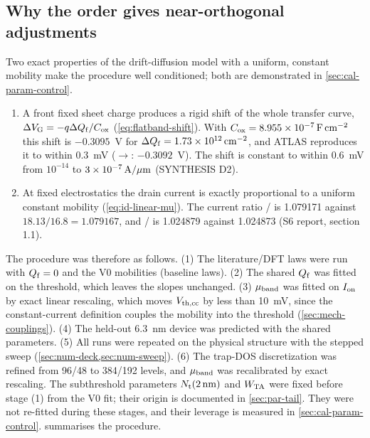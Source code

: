 \subsection{Why the order gives near-orthogonal adjustments}\label{sec:cal-order}
Two exact properties of the drift-diffusion model with a uniform, constant mobility make the procedure well conditioned; both are demonstrated in \cref{sec:cal-param-control}.
\begin{enumerate}
\item A front fixed sheet charge produces a rigid shift of the whole transfer curve, $\Delta V_{\mathrm{G}}=-q\Delta Q_{\mathrm{f}}/C_{\mathrm{ox}}$ (\cref{eq:flatband-shift}). With $C_{\mathrm{ox}}=\SI{8.955e-7}{\farad\per\centi\metre\squared}$ this shift is $-0.3095$~V for $\Delta Q_{\mathrm{f}}=\SI{1.73e12}{cm^{-2}}$, and ATLAS reproduces it to within 0.3~mV ($\rightarrow$: $-0.3092$~V). The shift is constant to within 0.6~mV from $10^{-14}$ to $3\times10^{-7}\,\mathrm{A}/\mu\mathrm{m}$ (SYNTHESIS D2).
\item At fixed electrostatics the drain current is exactly proportional to a uniform constant mobility (\cref{eq:id-linear-mu}). The current ratio / is 1.079171 against $18.13/16.8=1.079167$, and / is 1.024879 against 1.024873 (S6 report, section 1.1).
\end{enumerate}
The procedure was therefore as follows. (1) The literature/DFT laws were run with $Q_{\mathrm{f}}=0$ and the V0 mobilities (baseline laws). (2) The shared $Q_{\mathrm{f}}$ was fitted on the threshold, which leaves the slopes unchanged. (3) $\mu_{\mathrm{band}}$ was fitted on $I_{\mathrm{on}}$ by exact linear rescaling, which moves $V_{\mathrm{th,cc}}$ by less than 10~mV, since the constant-current definition couples the mobility into the threshold (\cref{sec:mech-couplings}). (4) The held-out 6.3~nm device was predicted with the shared parameters. (5) All runs were repeated on the physical structure with the stepped sweep (\cref{sec:num-deck,sec:num-sweep}). (6) The trap-DOS discretization was refined from 96/48 to 384/192 levels, and $\mu_{\mathrm{band}}$ was recalibrated by exact rescaling. The subthreshold parameters $N_{\mathrm{t}}(\SI{2}{nm})$ and $W_{\mathrm{TA}}$ were fixed before stage (1) from the V0 fit; their origin is documented in \cref{sec:par-tail}. They were not re-fitted during these stages, and their leverage is measured in \cref{sec:cal-param-control}.  summarises the procedure.

